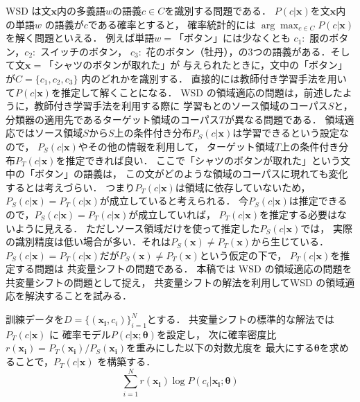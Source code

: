 \documentclass[japanese]{jnlp_1.4}
\begin{document}
WSD は文\( \boldsymbol{x} \)内の多義語\( w \)の語義\( c \in C \)を識別する問題である．
\( P(c|\boldsymbol{x}) \)を文\( \boldsymbol{x} \)内の単語\( w \)
の語義が\( c \)である確率とすると，
確率統計的には \( \arg \max_{c \in C} P(c|\boldsymbol{x}) \) を解く問題といえる．
例えば単語\( w =\)「ボタン」には少なくとも \(c_1:\) 服のボタン，\(c_2: \) スイッチのボタン，
\(c_3: \) 花のボタン（牡丹），の3つの語義がある．そして文\( \boldsymbol{x} =\)「シャツのボタンが取れた」が
与えられたときに，文中の「ボタン」が\( C= \{ c_1,c_2,c_3 \} \) 内のどれかを識別する．
直接的には教師付き学習手法を用いて\( P(c|\boldsymbol{x}) \)を推定して解くことになる．
WSD の領域適応の問題は，前述したように，教師付き学習手法を利用する際に
学習もとのソース領域のコーパス\( S \)と，
分類器の適用先であるターゲット領域のコーパス\( T \)が異なる問題である．
領域適応ではソース領域\( S \)から\( S \)上の条件付き分布\( P_S(c|\boldsymbol{x}) \)は学習できるという設定なので，
\( P_S(c|\boldsymbol{x}) \)やその他の情報を利用して，
ターゲット領域\( T \)上の条件付き分布\( P_T(c|\boldsymbol{x}) \)を推定できれば良い．
ここで「シャツのボタンが取れた」という文中の「ボタン」の語義は，
この文がどのような領域のコーパスに現れても変化するとは考えづらい．
つまり\( P_T(c|\boldsymbol{x}) \)は領域に依存していないため，
\( P_S(c|\boldsymbol{x}) = P_T(c|\boldsymbol{x}) \)が成立していると考えられる．
今\( P_S(c|\boldsymbol{x}) \)は推定できるので，\( P_S(c|\boldsymbol{x}) = P_T(c|\boldsymbol{x}) \)が成立していれば，
\( P_T(c|\boldsymbol{x}) \)を推定する必要はないように見える．
ただしソース領域だけを使って推定した\( P_S(c|\boldsymbol{x}) \)では，
実際の識別精度は低い場合が多い．それは\( P_S(\boldsymbol{x}) \ne P_T(\boldsymbol{x})\)から生じている．
\( P_S(c|\boldsymbol{x}) = P_T(c|\boldsymbol{x}) \)だが\( P_S(\boldsymbol{x}) \ne P_T(\boldsymbol{x})\)という仮定の下で，
\( P_T(c|\boldsymbol{x}) \)を推定する問題は
共変量シフトの問題\cite{shimodaira2000improving,sugiyama-2006-09-05,sugiyama-book}である．
本稿では WSD の領域適応の問題を共変量シフトの問題として捉え，
共変量シフトの解法を利用してWSD の領域適応を解決することを試みる．

訓練データを\( D = \{ (\boldsymbol{x_i},c_i) \}_{i = 1}^N \)とする．
共変量シフトの標準的な解法では\( P_T (c|\boldsymbol{x}) \) に
確率モデル\( P(c|\boldsymbol{x};\boldsymbol{\theta}) \)を設定し，
次に確率密度比\( r(\boldsymbol{x_i}) = P_T(\boldsymbol{x_i})/P_S(\boldsymbol{x_i}) \)を重みにした以下の対数尤度を
最大にする\( \boldsymbol{\theta} \)を求めることで，\( P_T (c|\boldsymbol{x}) \) を構築する．
\[
\sum_{i=1}^{N} r(\boldsymbol{x_i}) \log P(c_i|\boldsymbol{x_i};\boldsymbol{\theta})
\]
\end{document}
